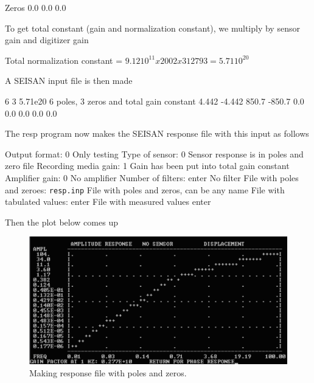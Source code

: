 Zeros  0.0  0.0  0.0 

To get total constant (gain and normalization constant),  we multiply by sensor gain and digitizer gain 

Total normalization constant = $9.12 10^{11} x 2002 x 312793 = 5.71 10^{20}$ 

A SEISAN input file is then made 

6 3 5.71e20 6 poles, 3 zeros and total gain constant  4.442  -4.442  850.7  -850.7  0.0  0.0  0.0  0.0  0.0 

The resp program now makes the SEISAN response file with this input as follows 

Output format: 0 Only testing \newline
Type of sensor: 0 Sensor response is in poles and zero file \newline
Recording media gain: 1 Gain has been put into total gain constant \newline
Amplifier gain: 0   No amplifier \newline
Number of filters: enter No filter \newline
File with poles and zeroes: \texttt{resp.inp} File with poles and zeros, can be any name \newline
File with tabulated values: enter \newline
File with measured values enter 

Then the plot below comes up 


\begin{figure}
\centerline{\includegraphics[width=0.9\linewidth]{fig/fig50}}
\caption{Making response file with poles and zeros.}
\end{figure}

